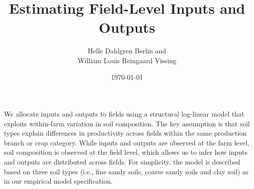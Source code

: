 \documentclass{scrartcl}
\title{Estimating Field-Level Inputs and Outputs}
\author{Helle Dahlgren Berlin and \\ William Louis Reingaard Vissing}
\date{\today}
\begin{document}
\maketitle

\noindent
We allocate inputs and outputs to fields using a structural log-linear model that exploits within-farm variation in soil composition.
The key assumption is that soil types explain differences in productivity across fields within the same production branch or crop category.
While inputs and outputs are observed at the farm level, soil composition is observed at the field level, which allows us to infer how inputs and outputs are distributed across fields.
For simplicity, the model is described based on three soil types (i.e., fine sandy soils, coarse sandy soils and clay soil) as in our empirical model specification.
\end{document}
